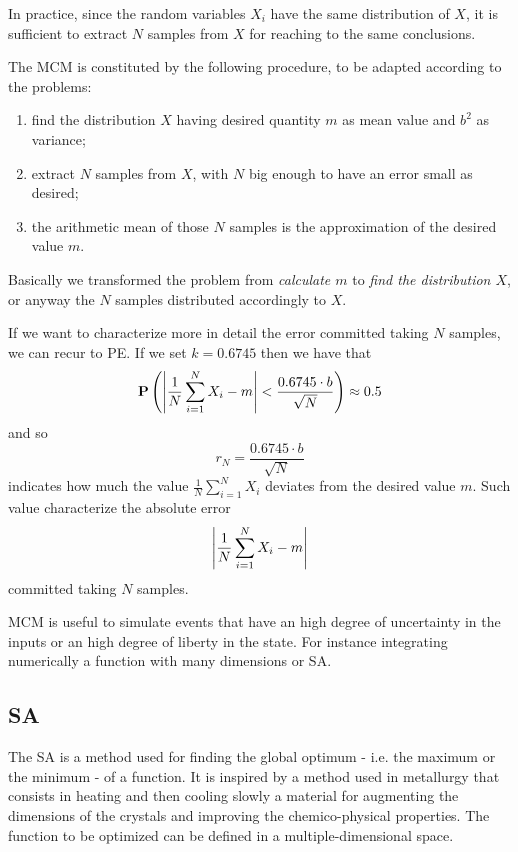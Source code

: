 \documentclass[dissertation.tex]{subfiles}
\begin{document}
In practice, since the random variables $X_i$ have the same
distribution of $X$, it is sufficient to extract $N$ samples from $X$ for
reaching to the same conclusions.

The \ac{MCM} is constituted by the following procedure, to be adapted
according to the problems:
\begin{enumerate}
\item find the distribution $X$ having desired quantity $m$ as mean
  value and $b^2$ as variance;
\item extract $N$ samples from $X$, with $N$ big enough to have an
  error small as desired;
\item the arithmetic mean of those $N$ samples is the approximation of
  the desired value $m$.
\end{enumerate}
Basically we transformed the problem from \emph{calculate $m$} to \emph{find
  the distribution $X$}, or anyway the $N$ samples distributed
accordingly to $X$.

If we want to characterize more in detail the error committed taking
$N$ samples, we can recur to \ac{PE}. If we set $k=0.6745$ then we
have that
\begin{equation*}
  \mathrm{\textbf{P}}\left(\left|\frac{1}{N}\sum_{i=1}^NX_i-m\right| <\frac{0.6745\cdot b}{\sqrt{N}}\right)\approx 0.5
\end{equation*}
and so
\begin{equation*}
  r_N = \frac{0.6745\cdot b}{\sqrt{N}}
\end{equation*}
indicates how much the value $\frac{1}{N}\sum_{i=1}^NX_i$ deviates
from the desired value $m$. Such value characterize the absolute error
\begin{equation*}
\left|\frac{1}{N}\sum_{i=1}^NX_i-m\right|  
\end{equation*}
committed taking $N$ samples.

\ac{MCM} is useful to simulate events that have an high degree of
uncertainty in the inputs or an high degree of liberty in the
state. For instance integrating numerically a function with many
dimensions or \ac{SA}.

\subsection{\acf{SA}}
The \ac{SA} is a method used for finding the global optimum - i.e. the
maximum or the minimum - of a function. It is inspired by a method
used in metallurgy that consists in heating and then cooling slowly a
material for augmenting the dimensions of the crystals and improving
the chemico-physical properties. The function to be optimized can be
defined in a multiple-dimensional space.
\end{document}
